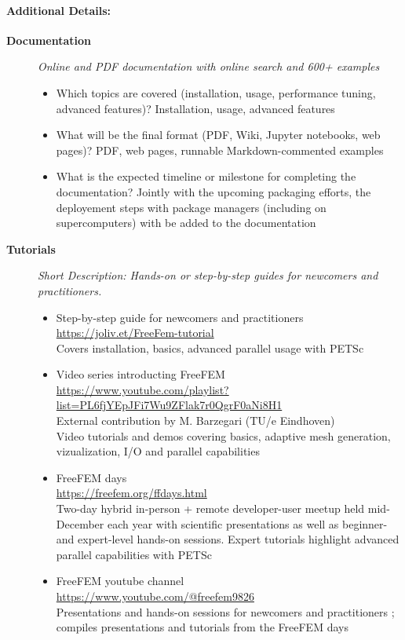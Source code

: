 \paragraph{Additional Details:}
\begin{description}
\item[\textbf{Documentation}] %
\emph{Online and PDF documentation with online search and 600+ examples}

\begin{itemize}
  \item Which topics are covered (installation, usage, performance tuning, advanced features)? Installation, usage, advanced features
  \item What will be the final format (PDF, Wiki, Jupyter notebooks, web pages)? PDF, web pages, runnable Markdown-commented examples
  \item What is the expected timeline or milestone for completing the documentation? Jointly with the upcoming packaging efforts, the deployement steps with package managers (including on supercomputers) with be added to the documentation
\end{itemize}

\item[\textbf{Tutorials}] %
\emph{Short Description: Hands-on or step-by-step guides for newcomers and practitioners.}

\begin{itemize}
\item Step-by-step guide for newcomers and practitioners\\\url{https://joliv.et/FreeFem-tutorial}\\Covers installation, basics, advanced parallel usage with PETSc\\
\item Video series introducting FreeFEM\\\url{https://www.youtube.com/playlist?list=PL6fjYEpJFi7Wu9ZFlak7r0QgrF0aNi8H1}\\External contribution by M. Barzegari (TU/e Eindhoven)\\Video tutorials and demos covering basics, adaptive mesh generation, vizualization, I/O and parallel capabilities\\
\item FreeFEM days\\\url{https://freefem.org/ffdays.html}\\Two-day hybrid in-person + remote developer-user meetup held mid-December each year with scientific presentations as well as beginner- and expert-level hands-on sessions. Expert tutorials highlight advanced parallel capabilities with PETSc\\
\item FreeFEM youtube channel\\\url{https://www.youtube.com/@freefem9826}\\Presentations and hands-on sessions for newcomers and practitioners ; compiles presentations and tutorials from the FreeFEM days\\
\end{itemize}

\end{description}



